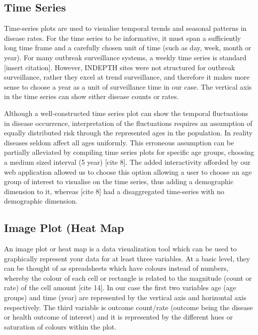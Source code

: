 \subsection{Time Series}

Time-series plots are used to visualise temporal trends and seasonal patterns in disease rates. For the time series to be informative, it must span a sufficiently long time frame and a carefully chosen unit of time (such as day, week, month or year). For many outbreak surveillance systems, a weekly time series is standard [insert citation]. However, INDEPTH sites were not structured for outbreak surveillance, rather they excel at trend surveillance, and therefore it makes more sense to choose a year as a unit of surveillance time in our case. The vertical axis in the time series can show either disease counts or rates. 

Although a well-constructed time series plot can show the temporal fluctuations in disease occurrence, interpretation of the fluctuations requires an assumption of equally distributed risk through the represented ages in the population. In reality diseases seldom affect all ages uniformly. This erroneous assumption can be partially alleviated by compiling time series plots for specific age groups, choosing a medium sized interval (5 year) [cite 8]. The added interactivity afforded by our web application allowed us to choose this option allowing a user to choose an age group of interest to visualise on the time series, thus adding a demographic dimension to it, whereas [cite 8] had a disaggregated time-series with no demographic dimension.

\subsection{Image Plot (Heat Map}

An image plot or heat map is a data visualization tool which can be used to graphically represent your data for at least three variables. At a basic level, they can be thought of as spreadsheets which have colours instead of numbers, whereby the colour of each cell or rectangle is related to the magnitude (count or rate) of the cell amount [cite 14]. In our case the first two variables age (age groups) and time (year) are represented by the vertical axis and horizontal axis respectively. The third variable is outcome count/rate (outcome being the disease or health outcome of interest) and it is represented by the different hues or saturation of colours within the plot.

